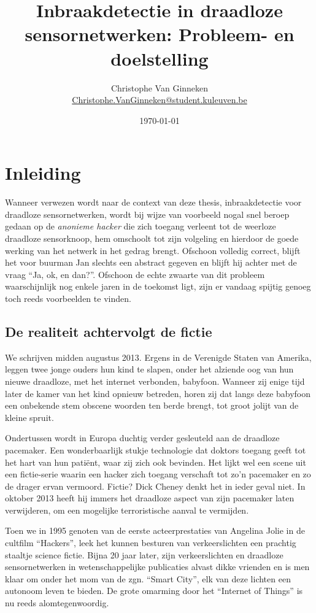 \documentclass[12pt,a4paper,draft]{article}
\author{Christophe Van Ginneken\\\url{Christophe.VanGinneken@student.kuleuven.be}}
\title{Inbraakdetectie in draadloze sensornetwerken: Probleem- en doelstelling}
\date{\today}
\begin{document}
\maketitle

\section*{Inleiding}

Wanneer verwezen wordt naar de context van deze thesis, inbraakdetectie voor
draadloze sensornetwerken, wordt bij wijze van voorbeeld nogal snel beroep
gedaan op de \emph{anonieme hacker} die zich toegang verleent tot de weerloze
draadloze sensorknoop, hem omschoolt tot zijn volgeling en hierdoor de goede
werking van het netwerk in het gedrag brengt. Ofschoon volledig correct, blijft
het voor buurman Jan slechts een abstract gegeven en blijft hij achter met de
vraag ``Ja, ok, en dan?''. Ofschoon de echte zwaarte van dit probleem
waarschijnlijk nog enkele jaren in de toekomst ligt, zijn er vandaag spijtig
genoeg toch reeds voorbeelden te vinden.

\subsection*{De realiteit achtervolgt de fictie}

We schrijven midden augustus 2013. Ergens in de Verenigde Staten van Amerika,
leggen twee jonge ouders hun kind te slapen, onder het alziende oog van hun
nieuwe draadloze, met het internet verbonden, babyfoon. Wanneer zij enige tijd
later de kamer van het kind opnieuw betreden, horen zij dat langs deze babyfoon
een onbekende stem obscene woorden ten berde brengt, tot groot jolijt van de
kleine spruit.

Ondertussen wordt in Europa duchtig verder gesleuteld aan de draadloze
pacemaker. Een wonderbaarlijk stukje technologie dat doktors toegang geeft tot
het hart van hun pati\"ent, waar zij zich ook bevinden. Het lijkt wel een scene
uit een fictie-serie waarin een hacker zich toegang verschaft tot zo'n
pacemaker en zo de drager ervan vermoord. Fictie? Dick Cheney denkt het in
ieder geval niet. In oktober 2013 heeft hij immers het draadloze aspect van
zijn pacemaker laten verwijderen, om een mogelijke terroristische aanval te
vermijden.

Toen we in 1995 genoten van de eerste acteerprestaties van Angelina Jolie in de
cultfilm ``Hackers'', leek het kunnen besturen van verkeerslichten een prachtig
staaltje science fictie. Bijna 20 jaar later, zijn verkeerslichten en draadloze
sensornetwerken in wetenschappelijke publicaties alvast dikke vrienden en is
men klaar om onder het mom van de zgn. ``Smart City'', elk van deze lichten een
autonoom leven te bieden. De grote omarming door het ``Internet of Things'' is
nu reeds alomtegenwoordig.
\end{document}
